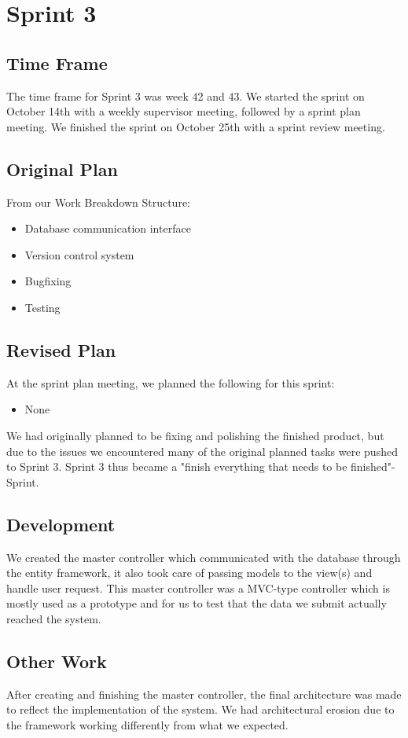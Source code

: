 \section{Sprint 3}

\subsection{Time Frame}
The time frame for Sprint 3 was week 42 and 43. We started the sprint on October 14th with a weekly supervisor meeting, followed by a sprint plan meeting. We finished the sprint on October 25th with a sprint review meeting.

\subsection{Original Plan}
From our Work Breakdown Structure:
\begin{itemize}
	\item Database communication interface
	\item Version control system
	\item Bugfixing
	\item Testing
\end{itemize}

\subsection{Revised Plan}
At the sprint plan meeting, we planned the following for this sprint:
\begin{itemize}
	\item None
\end{itemize}
We had originally planned to be fixing and polishing the finished product, but due to the issues we encountered many of the original planned tasks were pushed to Sprint 3. Sprint 3 thus became a "finish everything that needs to be finished"-Sprint.

\subsection{Development}
We created the master controller which communicated with the database through the entity framework, it also took care of passing models to the view(s) and handle user request. This master controller was a MVC-type controller which is mostly used as a prototype and for us to test that the data we submit actually reached the system.

\subsection{Other Work}
After creating and finishing the master controller, the final architecture was made to reflect the implementation of the system. We had architectural erosion due to the framework working differently from what we expected.

